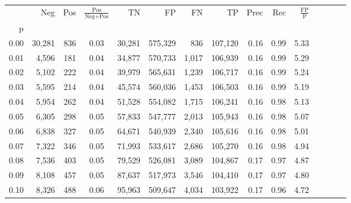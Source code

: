 \begin{tabular}{rrrcrrrrrrrrrrr}
\toprule
{} &     Neg &    Pos & $\frac{\text{Pos}}{\text{Neg}+\text{Pos}}$ &       TN &       FP &       FN &       TP &  Prec &   Rec & $\frac{\text{FP}}{\text{P}}$ \\
p    &         &        &                                            &          &          &          &          &       &       &                              \\
\midrule
0.00 &  30,281 &    836 &                                       0.03 &   30,281 &  575,329 &      836 &  107,120 &  0.16 &  0.99 &                         5.33 \\
0.01 &   4,596 &    181 &                                       0.04 &   34,877 &  570,733 &    1,017 &  106,939 &  0.16 &  0.99 &                         5.29 \\
0.02 &   5,102 &    222 &                                       0.04 &   39,979 &  565,631 &    1,239 &  106,717 &  0.16 &  0.99 &                         5.24 \\
0.03 &   5,595 &    214 &                                       0.04 &   45,574 &  560,036 &    1,453 &  106,503 &  0.16 &  0.99 &                         5.19 \\
0.04 &   5,954 &    262 &                                       0.04 &   51,528 &  554,082 &    1,715 &  106,241 &  0.16 &  0.98 &                         5.13 \\
0.05 &   6,305 &    298 &                                       0.05 &   57,833 &  547,777 &    2,013 &  105,943 &  0.16 &  0.98 &                         5.07 \\
0.06 &   6,838 &    327 &                                       0.05 &   64,671 &  540,939 &    2,340 &  105,616 &  0.16 &  0.98 &                         5.01 \\
0.07 &   7,322 &    346 &                                       0.05 &   71,993 &  533,617 &    2,686 &  105,270 &  0.16 &  0.98 &                         4.94 \\
0.08 &   7,536 &    403 &                                       0.05 &   79,529 &  526,081 &    3,089 &  104,867 &  0.17 &  0.97 &                         4.87 \\
0.09 &   8,108 &    457 &                                       0.05 &   87,637 &  517,973 &    3,546 &  104,410 &  0.17 &  0.97 &                         4.80 \\
0.10 &   8,326 &    488 &                                       0.06 &   95,963 &  509,647 &    4,034 &  103,922 &  0.17 &  0.96 &                         4.72 \\

\end{tabular}

